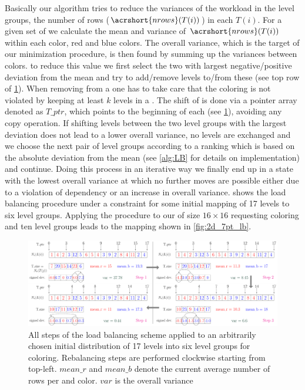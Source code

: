Basically our algorithm tries to reduce the variances of the workload in the level groups, \ie the number of rows ($\acrshort{nrows}(T(i))$) in each \levelGroup $T(i)$. For a given set of \levelGroups we calculate the mean and variance of $\acrshort{nrows}(T(i))$ within each color, \ie red and blue colors.  
The overall variance, which is the target of our minimization procedure, is then found by summing up the variances between colors. \Inorder to reduce this value we first select the two \levelGroups with largest negative/positive deviation from the mean and try to add/remove levels to/from these \levelGroups (see top row of \cref{fig:lb_alg}). When removing \levels from a \levelGroup one has to take care that the \DK coloring is not violated by keeping at least $k$ levels in a \levelGroup. The shift of \levels is done via a pointer array denoted as $T\_ptr$, which points to the beginning of each \levelGroup (see \cref{fig:lb_alg}), avoiding any copy operation. If shifting levels between the two level groups with the largest deviation does not lead to a lower overall variance, no levels are exchanged and we choose the next pair of level groups according to a ranking which is based on the absolute deviation from the mean (see \cref{alg:LB} for details on implementation) and continue. Doing this process in an iterative way we finally end up in a state with the lowest overall variance at which no further moves are possible either due to a violation of \DK dependency or an increase in overall variance.  shows the load balancing procedure under a \DTWO constraint for some initial mapping of 17 levels to six level groups. Applying the procedure to our  \stex of size $16 \times 16$  requesting \DTWO coloring and ten level groups leads to the mapping shown in \cref{fig:2d_7pt_lb}. 
  
   \begin{figure}[tbhp]
   	\centering
   	\includegraphics[height=0.22\textheight,width=\textwidth]{pics/load_balancing/lb_alg/lb_all}
   	\caption{All steps of the load balancing scheme applied to an arbitrarily chosen initial distribution of 17 levels into six level groups for \DTWO coloring. Rebalancing steps are performed clockwise starting from top-left. $mean\_r$ and $mean\_b$ denote the current average number of rows per \levelGroup and color. $var$ is the overall  variance}
   	\label{fig:lb_alg}
   \end{figure}
   
